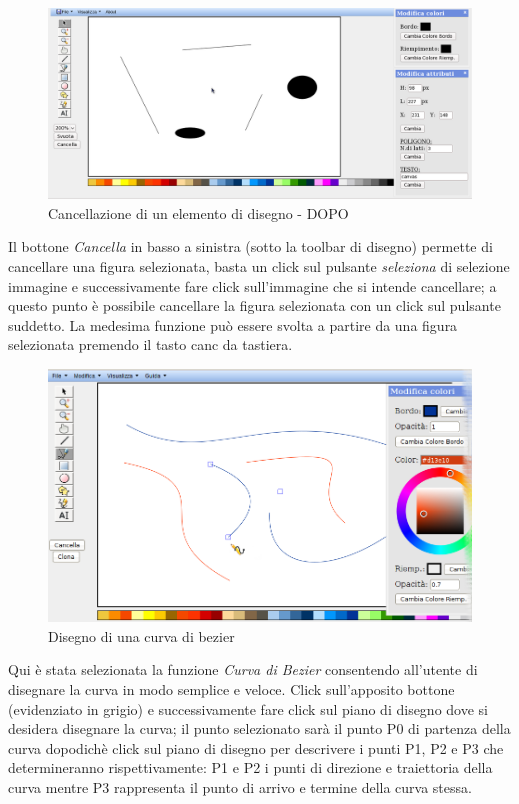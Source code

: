 \begin{figure}[!ht]
\centering
\includegraphics[scale=4]{images/cancella_elemento_dopo.png}
\caption{Cancellazione di un elemento di disegno  - DOPO}
\end{figure}

\vspace{100pt}
Il bottone \textit{Cancella} in basso a sinistra (sotto la toolbar di disegno) permette di cancellare una figura selezionata, 
basta un click sul pulsante \textit{seleziona} di selezione immagine e successivamente fare click sull'immagine che si intende cancellare; a questo punto \`e possibile cancellare la figura selezionata con un click sul pulsante suddetto. La medesima funzione può essere svolta a partire da una figura selezionata premendo il tasto canc da tastiera.

\begin{figure}[!ht]
\centering
\includegraphics[scale=4]{images/bezier.png}
\caption{Disegno di una curva di bezier}
\end{figure} 

\vspace{100pt}
Qui \`e stata selezionata la funzione \textit{Curva di Bezier} consentendo all'utente di disegnare la curva in modo semplice e veloce.
Click sull'apposito bottone (evidenziato in grigio)  e successivamente fare click sul piano di disegno dove si desidera disegnare la curva; il punto selezionato sar\`a il punto P0 di partenza della curva dopodich\`e click sul piano di disegno per descrivere i punti P1, P2 e P3 che determineranno rispettivamente: P1 e P2 i punti di direzione e traiettoria della curva mentre P3 rappresenta il punto di arrivo e termine della curva stessa.

